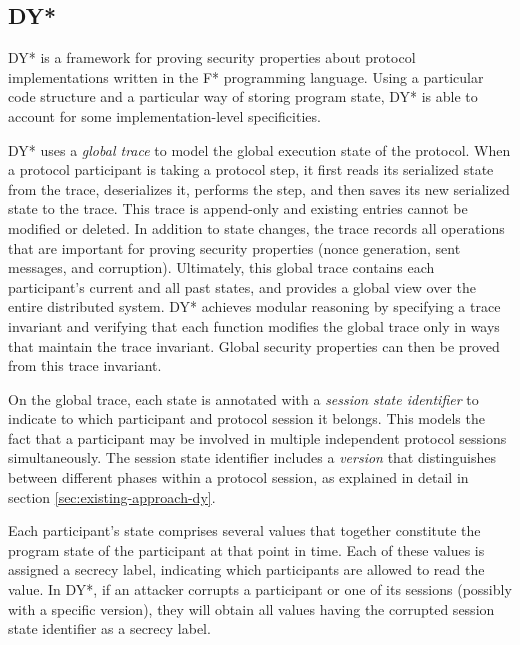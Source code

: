 \documentclass{article}
\begin{document}
\subsection{DY*}

DY*\cite{bhargavan2021text} is a framework for proving security properties about protocol implementations written in the F* programming language.
Using a particular code structure and a particular way of storing program state, DY* is able to account for some implementation-level specificities.

DY* uses a \emph{global trace} to model the global execution state of the protocol.
When a protocol participant is taking a protocol step, it first reads its serialized state from the trace, deserializes it, performs the step, and then saves its new serialized state to the trace. This trace is append-only and existing entries cannot be modified or deleted. In addition to state changes, the trace records all operations that are important for proving security properties (nonce generation, sent messages, and corruption).
Ultimately, this global trace contains each participant's current and all past states, and provides a global view over the entire distributed system. %
DY* achieves modular reasoning by specifying a trace invariant and verifying that each function modifies the global trace only in ways that maintain the trace invariant. Global security properties can then be proved from this trace invariant.

On the global trace, each state is annotated with a \emph{session state identifier} to indicate to which participant and protocol session it belongs. This models the fact that a participant may be involved in multiple independent protocol sessions simultaneously. The session state identifier includes a \emph{version} that distinguishes between different phases within a protocol session, as explained in detail in section \ref*{sec:existing-approach-dy}.

Each participant's state comprises several values that together constitute the program state of the participant at that point in time. Each of these values is assigned a secrecy label, indicating which participants are allowed to read the value. In DY*, if an attacker corrupts a participant or one of its sessions (possibly with a specific version), they will obtain all values having the corrupted session state identifier as a secrecy label.
\end{document}
